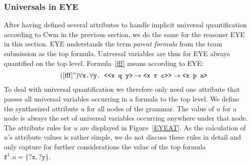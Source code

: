 \subsubsection{Universals in EYE}
After having defined several attributes to handle implicit universal quantification according to Cwm in the previous section, 
we do the same for the reasoner
EYE in this section. EYE understands the term \emph{parent formula} from the \wwwc team submission 
as the top formula.
Universal variables are thus for EYE always quantified on the top level. Formula~\ref{fff} means according to EYE:
\begin{multline}\tag{\ref{fff}''}\label{fff'}
  \forall \texttt{x.}\forall\texttt{y.}
 \texttt{ <{}<x q y>}\rightarrow\texttt{<x r c>{}>}\rightarrow\texttt{<x p a>}
\end{multline}
To deal with universal quantification we therefore only need one attribute that passes all universal variables occurring in a formula to the top level.
We define the synthesized attribute $u$ for all nodes of the grammar. %
The value of $u$ for a node is always the set of universal variables occurring anywhere under that node. %
The attribute rules for $u$ are displayed in Figure~\ref{EYEAT}. As the calculation of $u$'s attribute values is rather simple, 
we do not discuss these rules in detail and only capture for further considerations the value of the top formula  $\texttt{f}^1.u=\{\texttt{?x}, \texttt{?y}\}$.
